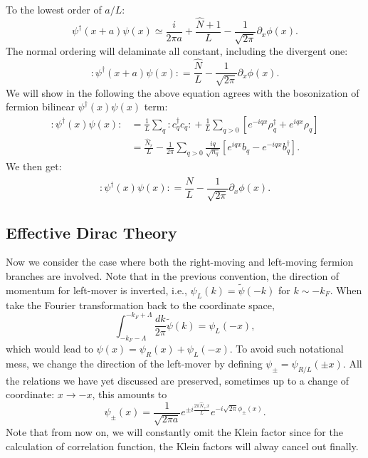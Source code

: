 \documentclass[aps,prb,superscriptaddress,nofootinbib]{revtex4}
\begin{document}
To the lowest order of $a/L$: 
\begin{equation}
	\psi^\dagger(x+a)\psi(x) \simeq \frac{i}{2\pi a} + \frac{\hat N+1}{L} - \frac{1}{\sqrt{2\pi}}\partial_x\phi(x).
\end{equation}
The normal ordering will delaminate all constant, including the divergent one:
\begin{equation}
	{:\mathrel{\psi^\dagger(x+a)\psi(x)}:}
	= \frac{\hat N}{L} - \frac{1}{\sqrt{2\pi}}\partial_x\phi(x).
\end{equation}
We will show in the following the above equation agrees with the bosonization of fermion bilinear $\psi^\dagger(x)\psi(x)$ term:
\begin{equation}
\begin{aligned}
	{:\mathrel{\psi^\dagger(x)\psi(x)}:}
	&= \frac{1}{L}\sum_{q} {:\mathrel{c_{q}^\dagger c_{q}}:} + \frac{1}{L}\sum_{q>0}[e^{-iqx}\rho^\dagger_{q}+e^{iqx}\rho_{q}] \\
	&= \frac{\hat N_r}{L} - \frac{1}{2\pi} \sum_{q>0} \frac{iq}{\sqrt{n_q}} \left[e^{iqx}b_{q} - e^{-iqx}b^\dagger_{q}\right].
\end{aligned}
\end{equation}
We then get:
\begin{equation}
	{:\mathrel{\psi^\dagger(x)\psi(x)}:}
	= \frac{\hat N}{L} - \frac{1}{\sqrt{2\pi}} \partial_x \phi(x).
\end{equation}

\subsection{Effective Dirac Theory}
Now we consider the case where both the right-moving and left-moving fermion branches are involved.
Note that in the previous convention, the direction of momentum for left-mover is inverted, i.e., $\psi_L(k) = \tilde\psi(-k)$ for $k \sim -k_F$.
When take the Fourier transformation back to the coordinate space,
\begin{equation}
	\int_{-k_F-\Lambda}^{-k_F+\Lambda} \frac{dk}{2\pi} \tilde\psi(k) = \psi_L(-x),
\end{equation}
which would lead to $\psi(x) = \psi_R(x)+\psi_L(-x)$. 
To avoid such notational mess, we change the direction of the left-mover by defining $\psi_{\pm} = \psi_{R/L}(\pm x)$.
All the relations we have yet discussed are preserved, sometimes up to a change of coordinate: $x \rightarrow -x$, this amounts to 
\begin{equation}
	\psi_{\pm}(x) = \frac{1}{\sqrt{2\pi a}}e^{\pm i\frac{2\pi\hat N_{\pm} x}{L}}e^{-i\sqrt{2\pi}\phi_{\pm}(x)}.
\end{equation}
Note that from now on, we will constantly omit the Klein factor since for the calculation of correlation function, the Klein factors will alway cancel out finally.
\end{document}
